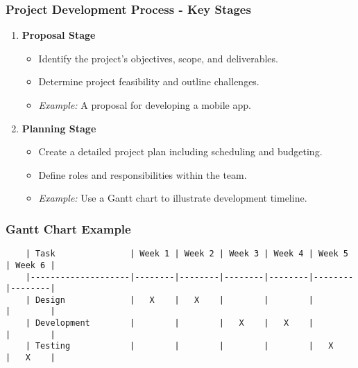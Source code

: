 \documentclass{beamer}
\begin{document}
\begin{frame}[fragile]
    \frametitle{Project Development Process - Key Stages}
    \begin{enumerate}
        \item \textbf{Proposal Stage}
        \begin{itemize}
            \item Identify the project’s objectives, scope, and deliverables.
            \item Determine project feasibility and outline challenges.
            \item \textit{Example:} A proposal for developing a mobile app.
        \end{itemize}
        
        \item \textbf{Planning Stage}
        \begin{itemize}
            \item Create a detailed project plan including scheduling and budgeting.
            \item Define roles and responsibilities within the team.
            \item \textit{Example:} Use a Gantt chart to illustrate development timeline.
        \end{itemize}
    \end{enumerate}
\end{frame}

\begin{frame}[fragile]
    \frametitle{Gantt Chart Example}
    \begin{lstlisting}
    | Task               | Week 1 | Week 2 | Week 3 | Week 4 | Week 5 | Week 6 |
    |--------------------|--------|--------|--------|--------|--------|--------|
    | Design             |   X    |   X    |        |        |        |        |
    | Development        |        |        |   X    |   X    |        |        |
    | Testing            |        |        |        |        |   X    |   X    |
    \end{lstlisting}
\end{frame}
\end{document}
